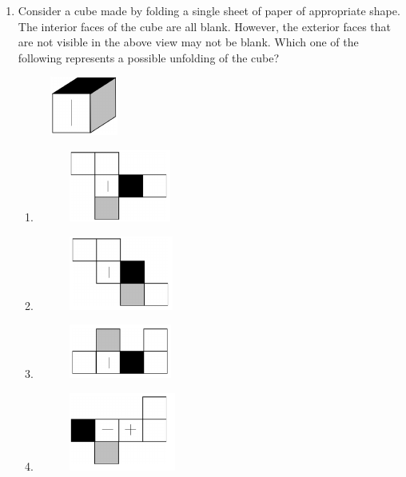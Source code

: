 \documentclass[journal,12pt,onecolumn]{IEEEtran}
\theoremstyle{remark}
\begin{document}
\begin{enumerate}
\item
Consider a cube made by folding a single sheet of paper of appropriate shape. The interior faces of the cube are all blank. However, the exterior faces that are not visible in the above view may not be blank. Which one of the following represents a possible unfolding of the cube?
\begin{center}
    \begin{figure}[H] \caption*{} \label{fig:10}\includegraphics{figs/10.png}\end{figure}%
\end{center}
\begin{enumerate}
 \item \begin{figure}[H] \caption*{} \label{fig:10a}\includegraphics{figs/10a.png}\end{figure}
 \item \begin{figure}[H] \caption*{} \label{fig:10b}\includegraphics{figs/10b.png}\end{figure}
 \item \begin{figure}[H] \caption*{} \label{fig:10c}\includegraphics{figs/10c.png}\end{figure}
 \item \begin{figure}[H] \caption*{} \label{fig:10d}\includegraphics{figs/10d.png}\end{figure}
\end{enumerate}


\end{enumerate}
\end{document}
